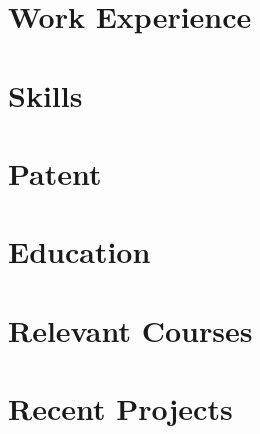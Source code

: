 \documentclass[letter,10pt]{article}
\begin{document}
%

\section{Work Experience}


\section{Skills}


\section{Patent}


\section{Education}


\section{Relevant Courses}


\section{Recent Projects}

\end{document}
